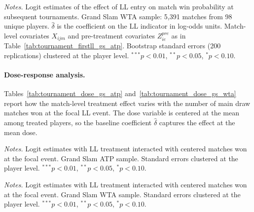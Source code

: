 \begin{table}[htbp]
\centering
\caption{Grand Slam Tournament Performance: WTA}
\label{tab:tournament_firstll_gs_wta}
\begin{threeparttable}
\small

\begin{tablenotes}
\footnotesize
\item \textit{Notes.} Logit estimates of the effect of LL entry on match win probability at subsequent tournaments. Grand Slam WTA sample: 5,391 matches from 98 unique players. $\hat{\delta}$ is the coefficient on the LL indicator in log-odds units. Match-level covariates $X_{ijm}$ and pre-treatment covariates $Z^{pre}_{ie}$ as in Table~\ref{tab:tournament_firstll_gs_atp}. Bootstrap standard errors (200 replications) clustered at the player level. $^{***}p<0.01$, $^{**}p<0.05$, $^{*}p<0.10$.
\end{tablenotes}
\end{threeparttable}
\end{table}

\paragraph{Dose-response analysis.} Tables~\ref{tab:tournament_dose_gs_atp} and~\ref{tab:tournament_dose_gs_wta} report how the match-level treatment effect varies with the number of main draw matches won at the focal LL event. The dose variable is centered at the mean among treated players, so the baseline coefficient $\hat{\delta}$ captures the effect at the mean dose.

\begin{table}[htbp]
\centering
\caption{Grand Slam Dose-Response: ATP (Centered)}
\label{tab:tournament_dose_gs_atp}
\begin{threeparttable}
\small

\begin{tablenotes}
\footnotesize
\item \textit{Notes.} Logit estimates with LL treatment interacted with centered matches won at the focal event. Grand Slam ATP sample. Standard errors clustered at the player level. $^{***}p<0.01$, $^{**}p<0.05$, $^{*}p<0.10$.
\end{tablenotes}
\end{threeparttable}
\end{table}

\begin{table}[htbp]
\centering
\caption{Grand Slam Dose-Response: WTA (Centered)}
\label{tab:tournament_dose_gs_wta}
\begin{threeparttable}
\small

\begin{tablenotes}
\footnotesize
\item \textit{Notes.} Logit estimates with LL treatment interacted with centered matches won at the focal event. Grand Slam WTA sample. Standard errors clustered at the player level. $^{***}p<0.01$, $^{**}p<0.05$, $^{*}p<0.10$.
\end{tablenotes}
\end{threeparttable}
\end{table}

